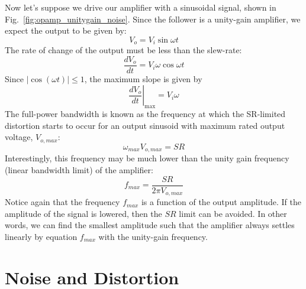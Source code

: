 Now let's suppose we drive our amplifier with a sinusoidal signal, shown in Fig.~\ref{fig:opamp_unitygain_noise}.   Since the follower is a  unity-gain amplifier, we expect the output to be given by:
\begin{equation} 
	V_o = V_i \sin\omega t 
\end{equation}
The rate of change of the output must be less than the slew-rate:
\begin{equation}
	\frac{dV_o}{dt} = V_i \omega \cos\omega t 
\end{equation}
Since $|\cos(\omega t)| \le 1$, the maximum slope is given by
\begin{equation}
	\left. \frac{dV_o}{dt} \right|_{\text{max}} = V_i \omega 
\end{equation}
The full-power bandwidth is known as the frequency at which the SR-limited distortion starts to occur for an output sinusoid with maximum rated output voltage, $V_{o,max}$:
\begin{equation}
	\omega_{max} V_{o,max} = SR
\end{equation} 
Interestingly, this frequency may be much lower than the unity gain frequency (linear bandwidth limit) of the amplifier:
\begin{equation} 
	f_{max} = \frac{SR}{2\pi V_{o,max}} 
\end{equation}
Notice again that the frequency $f_{max}$ is a function of the output amplitude.  If the amplitude of the signal is lowered, then the $SR$ limit can be avoided.  In other words, we can find the smallest amplitude such that the amplifier always settles linearly by equation $f_{max}$ with the unity-gain frequency.
\section{Noise and Distortion}
